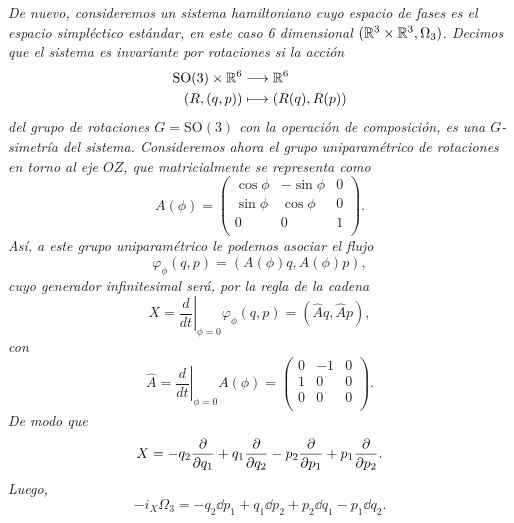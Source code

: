 \begin{ejemplo}
  \em
  De nuevo, consideremos un sistema hamiltoniano cuyo espacio de fases es el espacio simpléctico estándar, en este caso 6 dimensional $(\mathbb{R}^{3}\times \mathbb{R}^3,\Omega_3)$. Decimos que el sistema es \emph{invariante por rotaciones} si la acción
  \begin{align*}
    \mathrm{SO}(3) \times \mathbb{R}^{6}&\longrightarrow \mathbb{R}^{6}\\ 
      (R,(q,p)) &\longmapsto (R(q),R(p)) 
    \end{align*}
    del grupo de rotaciones $G=\mathrm{SO}(3)$ con la operación de composición, es una $G$-simetría del sistema. Consideremos ahora el grupo uniparamétrico de rotaciones en torno al eje $OZ$, que matricialmente se representa como
    \begin{equation*}
      A(\phi)=\left(
      \begin{array}{ccc}
	\cos\phi & -\sin\phi & 0 \\
	\sin\phi & \cos\phi & 0 \\
	0 & 0 & 1 \\
      \end{array}\right).
    \end{equation*}
    Así, a este grupo uniparamétrico le podemos asociar el flujo
    \begin{equation*}
      \varphi_{\phi}(q,p)=(A(\phi)q,A(\phi)p),
    \end{equation*}
    cuyo generador infinitesimal será, por la regla de la cadena
    \begin{equation*}
      X=\left.\frac{d}{dt}\right|_{\phi=0}\varphi_{\phi}(q,p)=(\hat{A}q,\hat{A}p),
    \end{equation*}
    con 
    \begin{equation*}
      \hat{A}=\left.\frac{d}{dt}\right|_{\phi=0}A(\phi)=\left(
      \begin{array}{ccc}
	0 & -1 & 0 \\
	1 & 0 & 0 \\
	0 & 0 & 0 \\
      \end{array}\right).
    \end{equation*}
    De modo que 
    \begin{equation*}
      X=-q_2\frac{\partial}{\partial q_1}+q_1\frac{\partial}{\partial q_2}-p_2\frac{\partial}{\partial p_1}+p_1\frac{\partial}{\partial p_2}.
    \end{equation*}
    Luego,
    \begin{equation*}
      -i_X\Omega_3=-q_2\dd p_1+q_1\dd p_2 +p_2 \dd q_1 - p_1 \dd q_2.
    \end{equation*}


\end{ejemplo}
